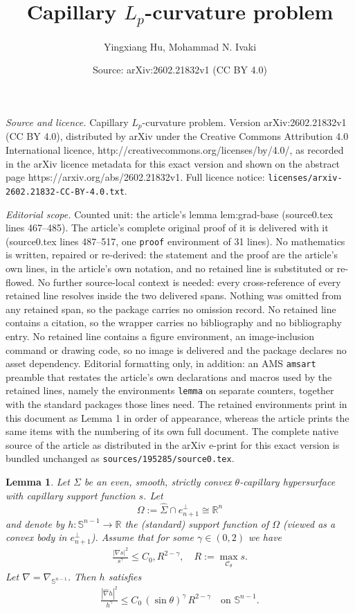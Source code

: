 \documentclass[10pt,a4paper]{amsart}
\title{Capillary $L_p$-curvature problem}
\author{Yingxiang Hu, Mohammad N. Ivaki}
\date{Source: arXiv:2602.21832v1 (CC BY 4.0)}
\newtheorem{lemma}{Lemma}
\newcommand{\bbR}{\mathbb{R}}
\newcommand{\bbS}{\mathbb{S}}
\newcommand{\cC}{\mathcal{C}}
\newcommand{\eq}[1]{\begin{equation}\begin{alignedat}{2}#1\end{alignedat}\end{equation}}
\newcommand{\wh}{\widehat}
\begin{document}
\maketitle

\noindent\emph{Source and licence.} Capillary $L_p$-curvature problem. Version arXiv:2602.21832v1 (CC BY 4.0), distributed by arXiv under the Creative Commons Attribution 4.0 International licence, http://creativecommons.org/licenses/by/4.0/, as recorded in the arXiv licence metadata for this exact version and shown on the abstract page https://arxiv.org/abs/2602.21832v1. Full licence notice: \texttt{licenses/arxiv-2602.21832-CC-BY-4.0.txt}.\par\smallskip

\noindent\textit{Editorial scope.} Counted unit: the article's lemma lem:grad-base (source0.tex lines 467--485). The article's complete original proof of it is delivered with it (source0.tex lines 487--517, one \texttt{proof} environment of 31 lines). No mathematics is written, repaired or re-derived: the statement and the proof are the article's own lines, in the article's own notation, and no retained line is substituted or re-flowed.  No further source-local context is needed: every cross-reference of every retained line resolves inside the two delivered spans.  Nothing was omitted from any retained span, so the package carries no omission record.  No retained line contains a citation, so the wrapper carries no bibliography and no bibliography entry.  No retained line contains a figure environment, an image-inclusion command or drawing code, so no image is delivered and the package declares no asset dependency.  Editorial formatting only, in addition: an AMS \texttt{amsart} preamble that restates the article's own declarations and macros used by the retained lines, namely the environments \texttt{lemma} on separate counters, together with the standard packages those lines need.  The retained environments print in this document as Lemma 1 in order of appearance, whereas the article prints the same items with the numbering of its own full document.  The complete native source of the article as distributed in the arXiv e-print for this exact version is bundled unchanged as \texttt{sources/195285/source0.tex}.
\begin{lemma}\label{lem:grad-base}
Let $\Sigma$ be an even, smooth, strictly convex $\theta$-capillary hypersurface with capillary support function $s$. Let
\[
\Omega:=\widehat{\Sigma}\cap e_{n+1}^\perp\cong\bbR^n
\]
and denote by $h:\bbS^{n-1}\to\bbR$ the (standard) support function of $\Omega$
(viewed as a convex body in $e_{n+1}^\perp$).
Assume that for some $\gamma\in(0,2)$ we have
\eq{\label{eq:cap-grad}
\frac{|\nabla s|^2}{s^\gamma}\le C_0,R^{2-\gamma},
\quad
R:=\max_{\cC_\theta}s.
}
Let $\wh{\nabla}=\nabla_{\bbS^{n-1}}$. Then $h$ satisfies
\eq{\label{eq:base-grad}
\frac{|\wh{\nabla}h|^2}{h^\gamma}
\le C_0\,(\sin\theta)^{\gamma}\,R^{2-\gamma} \quad  \text{on } \bbS^{n-1}.
}
\end{lemma}
\end{document}

